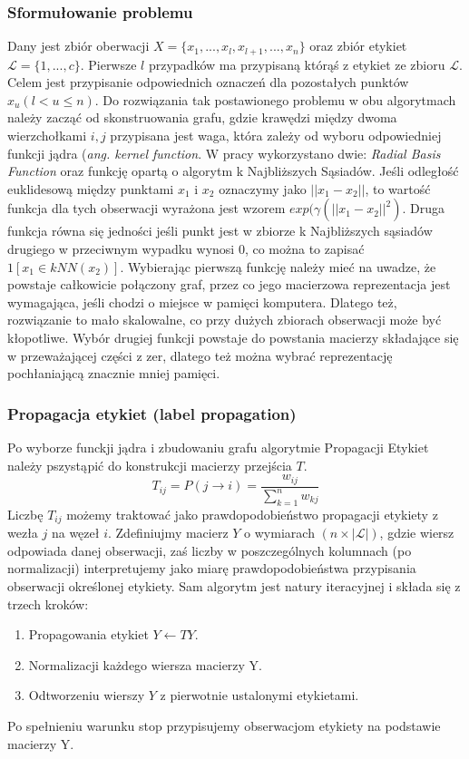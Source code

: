 \documentclass{article}
\begin{document}
\subsubsection{Sformułowanie problemu}
Dany jest zbiór oberwacji \(X = \{x_1, ..., x_l, x_{l+1}, ..., x_n\}\) oraz zbiór etykiet \(\mathcal{L} = \{1, ... ,c\}\).
Pierwsze \(l\) przypadków ma przypisaną którąś z etykiet ze zbioru \(\mathcal{L}\). Celem jest przypisanie odpowiednich oznaczeń dla pozostałych punktów \(x_u(l  < u \leqslant n)\).
Do rozwiązania tak postawionego problemu w obu algorytmach należy zacząć od skonstruowania grafu, gdzie krawędzi między dwoma wierzchołkami \(i, j\) przypisana jest waga, która zależy od wyboru odpowiedniej funkcji jądra (\emph{ang. kernel function}. W pracy wykorzystano dwie: \emph{Radial Basis Function} oraz funkcję opartą o algorytm k Najbliższych Sąsiadów. Jeśli odległość euklidesową między punktami \(x_1\) i \(x_2\) oznaczymy jako \(||x_1 - x_2||\), to wartość funkcja dla tych obserwacji wyrażona jest wzorem \(exp(\gamma(||x_1 - x_2||^2)\).
Druga funkcja równa się jedności jeśli punkt jest w zbiorze k Najbliższych sąsiadów drugiego w przeciwnym wypadku wynosi 0, co można to zapisać \(1[x_1 \in kNN(x_2)]\). 
Wybierając pierwszą funkcję należy mieć na uwadze, że powstaje całkowicie połączony graf, przez co jego macierzowa reprezentacja jest wymagająca, jeśli chodzi o miejsce w pamięci komputera.
Dlatego też, rozwiązanie to mało skalowalne, co przy dużych zbiorach obserwacji może być kłopotliwe.
Wybór drugiej funkcji powstaje do powstania macierzy składające się w przeważającej części z zer, dlatego też można wybrać reprezentację pochłaniającą znacznie mniej pamięci.
\subsubsection{Propagacja etykiet (label propagation)}
Po wyborze funckji jądra i zbudowaniu grafu algorytmie Propagacji Etykiet należy pszystąpić do konstrukcji macierzy przejścia \(T\).
\[T_{ij} = P(j \rightarrow i) = \frac{w_{ij}}{\sum^n_{k=1}w_{kj}}\]
Liczbę \(T_{ij}\) możemy traktować jako prawdopodobieństwo propagacji etykiety z wezła \(j\) na węzeł \(i\). Zdefiniujmy macierz \(Y\) o wymiarach \((n \times |\mathcal{L}|)\), gdzie wiersz odpowiada danej obserwacji, zaś liczby w poszczególnych kolumnach (po normalizacji) interpretujemy jako miarę prawdopodobieństwa przypisania obserwacji określonej etykiety.
Sam algorytm jest natury iteracyjnej i składa się z trzech kroków:
\begin{enumerate}
	\item Propagowania etykiet \(Y \leftarrow TY\).
	\item Normalizacji każdego wiersza macierzy Y.
	\item Odtworzeniu wierszy \(Y\) z pierwotnie ustalonymi etykietami.
\end{enumerate}
Po spełnieniu warunku stop przypisujemy obserwacjom etykiety na podstawie macierzy Y\cite{Zhu2002}.
\end{document}
